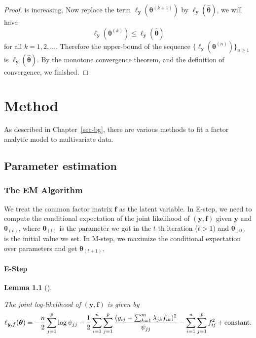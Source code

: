 \documentclass[
  a4paper,
  oneside,
  openany,
  12pt,
  onecolumn,
  twoside]{book}
\theoremstyle{plain}
\newtheorem{lemma}{Lemma}[chapter]
\theoremstyle{remark}
\begin{document}
\begin{proof}
is increasing. Now replace the term
\(\ell_{\boldsymbol{y}}(\boldsymbol{\theta}^{(k+1)})\) by
\(\ell_{\boldsymbol{y}}(\hat{\boldsymbol{{\theta}}})\), we will have \[
\ell_{\boldsymbol{y}}(\boldsymbol{\theta}^{(k)}) \leq \ell_{\boldsymbol{y}}(\hat{\boldsymbol{{\theta}}})
\] for all \(k=1,2,\dots\). Therefore the upper-bound of the sequence
\(\{\ell_{\boldsymbol{y}}(\boldsymbol{\theta}^{(n)})\}_{n\geq 1}\) is
\(\ell_{\boldsymbol{y}}(\hat{\boldsymbol{\theta}})\). By the monotone
convergence theorem, and the definition of convergence, we finished.
\end{proof}


\chapter{Method}\label{sec-method}

As described in Chapter~\ref{sec-bg}, there are various methods to fit a
factor analytic model to multivariate data.

\section{Parameter estimation}\label{parameter-estimation-1}

\subsection{The EM Algorithm}\label{the-em-algorithm}

We treat the common factor matrix \(\boldsymbol{f}\) as the latent
variable. In E-step, we need to compute the conditional expectation of
the joint likelihood of \((\boldsymbol{y},\boldsymbol{f})\) given
\(\boldsymbol{y}\) and \(\boldsymbol{\theta}_{(t)}\), where
\(\boldsymbol{\theta}_{(t)}\) is the parameter we got in the \(t\)-th
iteration (\(t>1\)) and \(\boldsymbol{\theta}_{(0)}\) is the initial
value we set. In M-step, we maximize the conditional expectation over
parameters and get \(\boldsymbol{\theta}_{(t + 1)}\).

\subsubsection{E-Step}\label{e-step}

\begin{lemma}[]\protect\hypertarget{lem-fa-likelihood}{}\label{lem-fa-likelihood}

The joint log-likelihood of \((\boldsymbol{y},\boldsymbol{f})\) is given
by
\[\ell_{\boldsymbol{y},\boldsymbol{f}}(\boldsymbol{\theta})= -\frac{n}{2} \sum_{j=1}^p\log\psi_{jj}-\frac{1}{2}\sum_{i=1}^n\sum_{j=1}^p \frac{(y_{ij} - \sum_{k=1}^m \lambda_{jk}f_{ik})^2}{\psi_{jj}} - \sum_{i=1}^n\sum_{j=1}^pf_{ij}^2 + \text{constant}.\\\]

\end{lemma}
\end{document}
